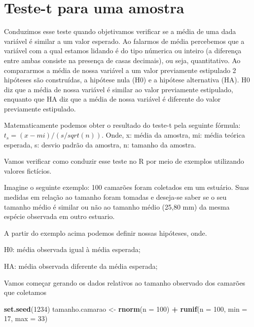 \documentclass[]{book}
\newenvironment{Shaded}{\begin{snugshade}}{\end{snugshade}}
\newcommand{\DataTypeTok}[1]{\textcolor[rgb]{0.13,0.29,0.53}{#1}}
\newcommand{\DecValTok}[1]{\textcolor[rgb]{0.00,0.00,0.81}{#1}}
\newcommand{\KeywordTok}[1]{\textcolor[rgb]{0.13,0.29,0.53}{\textbf{#1}}}
\newcommand{\NormalTok}[1]{#1}
\newcommand{\OperatorTok}[1]{\textcolor[rgb]{0.81,0.36,0.00}{\textbf{#1}}}
\newcommand{\StringTok}[1]{\textcolor[rgb]{0.31,0.60,0.02}{#1}}
\begin{document}
\hypertarget{teste-t-para-uma-amostra}{%
\section{Teste-t para uma amostra}\label{teste-t-para-uma-amostra}}

Conduzimos esse teste quando objetivamos verificar se a média de uma dada variável é similar a um valor esperado. Ao falarmos de média percebemos que a variável com a qual estamos lidando é do tipo númerica ou inteiro (a diferença entre ambas consiste na presença de casas decimais), ou seja, quantitativo. Ao compararmos a média de nossa variável a um valor previamente estipulado 2 hipóteses são construídas, a hipótese nula (H0) e a hipótese alternativa (HA). H0 diz que a média de nossa variável é similar ao valor previamente estipulado, enquanto que HA diz que a média de nossa variável é diferente do valor previamente estipulado.

Matematicamente podemos obter o resultado do teste-t pela seguinte fórmula: \(t_s=(x-mi)/(s/sqrt(n))\). Onde, x: média da amostra, mi: média teórica esperada, s: desvio padrão da amostra, n: tamanho da amostra.

Vamos verificar como conduzir esse teste no R por meio de exemplos utilizando valores fictícios.

Imagine o seguinte exemplo: 100 camarões foram coletados em um estuário. Suas medidas em relação ao tamanho foram tomadas e deseja-se saber se o seu tamanho médio é similar ou não ao tamanho médio (25,80 mm) da mesma espécie observada em outro estuario.

A partir do exemplo acima podemos definir nossas hipóteses, onde.

H0: média observada igual à média esperada;

HA: média observada diferente da média esperada;

Vamos começar gerando os dados relativos ao tamanho observado dos camarões que coletamos

\begin{Shaded}
\begin{Highlighting}[]
\KeywordTok{set.seed}\NormalTok{(}\DecValTok{1234}\NormalTok{)}
\NormalTok{tamanho.camarao <-}\StringTok{ }\KeywordTok{rnorm}\NormalTok{(}\DataTypeTok{n =} \DecValTok{100}\NormalTok{) }\OperatorTok{+}\StringTok{ }\KeywordTok{runif}\NormalTok{(}\DataTypeTok{n =} \DecValTok{100}\NormalTok{, }\DataTypeTok{min =} \DecValTok{17}\NormalTok{, }\DataTypeTok{max =} \DecValTok{33}\NormalTok{)}
\end{Highlighting}
\end{Shaded}
\end{document}
